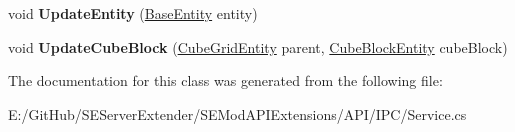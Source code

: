 \begin{DoxyCompactItemize}
\item 
\hypertarget{class_s_e_mod_a_p_i_extensions_1_1_a_p_i_1_1_i_p_c_1_1_internal_service_a6e15e6e2b1ae576ef7e6442debac72b6}{}void {\bfseries Update\+Entity} (\hyperlink{class_s_e_mod_a_p_i_internal_1_1_a_p_i_1_1_entity_1_1_base_entity}{Base\+Entity} entity)\label{class_s_e_mod_a_p_i_extensions_1_1_a_p_i_1_1_i_p_c_1_1_internal_service_a6e15e6e2b1ae576ef7e6442debac72b6}

\item 
\hypertarget{class_s_e_mod_a_p_i_extensions_1_1_a_p_i_1_1_i_p_c_1_1_internal_service_ab3ac4c2d13c597b9d6d16663793b4068}{}void {\bfseries Update\+Cube\+Block} (\hyperlink{class_s_e_mod_a_p_i_internal_1_1_a_p_i_1_1_entity_1_1_sector_1_1_sector_object_1_1_cube_grid_entity}{Cube\+Grid\+Entity} parent, \hyperlink{class_s_e_mod_a_p_i_internal_1_1_a_p_i_1_1_entity_1_1_sector_1_1_sector_object_1_1_cube_grid_1_1_cube_block_entity}{Cube\+Block\+Entity} cube\+Block)\label{class_s_e_mod_a_p_i_extensions_1_1_a_p_i_1_1_i_p_c_1_1_internal_service_ab3ac4c2d13c597b9d6d16663793b4068}

\end{DoxyCompactItemize}


The documentation for this class was generated from the following file\+:\begin{DoxyCompactItemize}
\item 
E\+:/\+Git\+Hub/\+S\+E\+Server\+Extender/\+S\+E\+Mod\+A\+P\+I\+Extensions/\+A\+P\+I/\+I\+P\+C/Service.\+cs\end{DoxyCompactItemize}
